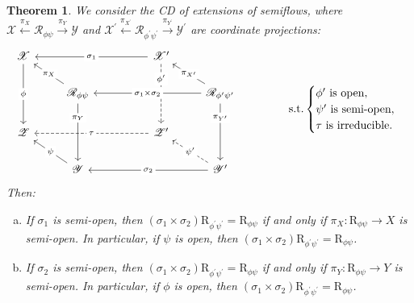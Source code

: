 \documentclass[12pt,final,3p,times]{elsarticle}
\newtheorem{thm}{Theorem}[section]
\theoremstyle{definition}
\numberwithin{equation}{section}
\begin{document}
\begin{thm}\label{3.8}
We consider the CD of extensions of semiflows, where $\mathscr{X}\xleftarrow{\pi_X}\mathscr{R}_{\phi\psi}\xrightarrow{\pi_Y}\mathscr{Y}$ and $\mathscr{X}^\prime\xleftarrow{\pi_{X^\prime}}\mathscr{R}_{\phi^\prime\psi^\prime}\xrightarrow{\pi_{Y^\prime}}\mathscr{Y}^\prime$ are coordinate projections:
$$
\begin{tikzcd}
	\mathscr{X} \arrow[dd, "\phi"description] &&& \mathscr{X^{\prime}} \arrow[lll, "\sigma_1"description] \arrow[dd,dashed, "\phi^{\prime}"description,near start] &\\
	& \mathscr{R}_{\phi\psi} \arrow[ul, "\pi_X"description] \arrow[dd, "\pi_Y"description,near start] 
	&&& \mathscr{R}_{\phi^\prime \psi^{\prime}} \arrow[lll, "\sigma_1\times\sigma_2"description] \arrow[ul, "\pi_{X^\prime}"description] \arrow[dd, "\pi_{Y^\prime}"description,near start]\\
	\mathscr{Z}  &&& \mathscr{Z^{\prime}} \arrow[lll,dashed, "\tau"description] &\\
	& \mathscr{Y} \arrow[ul, "\psi"description] &&& \mathscr{Y^\prime} \arrow[lll, "\sigma_2"description] \arrow[ul,dashed, "\psi^\prime"description] &
\end{tikzcd}
\quad\quad \textrm{s.t.}
\begin{cases}
\phi^\prime\textrm{ is open},\\
\psi^\prime\textrm{ is semi-open},\\
\tau\textrm{ is irreducible}.\end{cases}
$$
Then:
\begin{enumerate}[(a)]
\item If $\sigma_1$ is semi-open, then $(\sigma_1\times\sigma_2)\mathrm{R}_{\phi^\prime\psi^\prime}=\mathrm{R}_{\phi\psi}$ if and only if  $\pi_X\colon\mathrm{R}_{\phi\psi}\rightarrow X$ is semi-open. In particular, if $\psi$ is open, then $(\sigma_1\times\sigma_2)\mathrm{R}_{\phi^\prime\psi^\prime}=\mathrm{R}_{\phi\psi}$.
\item If $\sigma_2$ is semi-open, then $(\sigma_1\times\sigma_2)\mathrm{R}_{\phi^\prime\psi^\prime}=\mathrm{R}_{\phi\psi}$ if and only if $\pi_Y\colon\mathrm{R}_{\phi\psi}\rightarrow Y$ is semi-open. In particular, if $\phi$ is open, then $(\sigma_1\times\sigma_2)\mathrm{R}_{\phi^\prime\psi^\prime}=\mathrm{R}_{\phi\psi}$.
\end{enumerate}
\end{thm}
\end{document}
